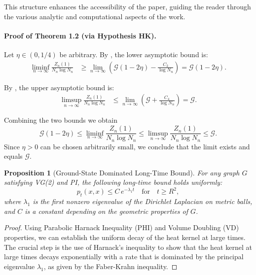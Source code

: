 \documentclass{article}
\numberwithin{equation}{section}
\newtheorem{proposition}[theorem]{Proposition}
\theoremstyle{definition}
\theoremstyle{remark}
\newcommand{\cG}{\mathcal{G}}    %
\begin{document}
This structure enhances the accessibility of the paper, guiding the reader through the various analytic and computational aspects of the work.

\paragraph{Proof of Theorem 1.2 (via Hypothesis HK).}
Let $\eta \in (0,1/4)$ be arbitrary. By , the lower asymptotic bound is:
\begin{align*}
\liminf_{n \to \infty} \frac{Z_n(1)}{N_n \log N_n} &\geq \lim_{n \to \infty} \left( \cG(1-2\eta) - \frac{C_2}{\log N_n} \right) = \cG(1-2\eta).
\end{align*}

By , the upper asymptotic bound is:
\begin{align*}
\limsup_{n \to \infty} \frac{Z_n(1)}{N_n \log N_n} &\leq \lim_{n \to \infty} \left( \cG + \frac{C_4}{\log N_n} \right) = \cG.
\end{align*}

Combining the two bounds we obtain
\[
\cG(1-2\eta) \leq \liminf_{n \to \infty} \frac{Z_n(1)}{N_n \log N_n} \leq \limsup_{n \to \infty} \frac{Z_n(1)}{N_n \log N_n} \leq \cG.
\]
Since $\eta > 0$ can be chosen arbitrarily small, we conclude that the limit exists and equals $\cG$.

\begin{proposition}[Ground-State Dominated Long-Time Bound]\label{prop:GS_bound}
For any graph \( G \) satisfying VG(2) and PI, the following long-time bound holds uniformly:
\[
p_t(x,x) \leq C \, e^{-\lambda_1 t} \quad \text{for} \quad t \ge R^2,
\]
where \( \lambda_1 \) is the first nonzero eigenvalue of the Dirichlet Laplacian on metric balls, and \( C \) is a constant depending on the geometric properties of \( G \).
\end{proposition}

\begin{proof}
Using Parabolic Harnack Inequality (PHI) and Volume Doubling (VD) properties, we can establish the uniform decay of the heat kernel at large times. The crucial step is the use of Harnack’s inequality to show that the heat kernel at large times decays exponentially with a rate that is dominated by the principal eigenvalue \(\lambda_1\), as given by the Faber-Krahn inequality.
\end{proof}
 
\end{document}
